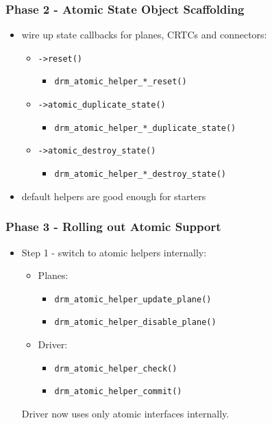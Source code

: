 \documentclass[t]{beamer}
\begin{document}
\begin{frame}
	\frametitle{Phase 2 - Atomic State Object Scaffolding}
	\begin{itemize}
		\item wire up state callbacks for planes, CRTCs and connectors:
			\begin{itemize}
				\item {\tt ->reset()}
					\begin{itemize}
						\item {\tt drm\_atomic\_helper\_*\_reset()}
					\end{itemize}
				\item {\tt ->atomic\_duplicate\_state()}
					\begin{itemize}
						\item {\tt drm\_atomic\_helper\_*\_duplicate\_state()}
					\end{itemize}
				\item {\tt ->atomic\_destroy\_state()}
					\begin{itemize}
						\item {\tt drm\_atomic\_helper\_*\_destroy\_state()}
					\end{itemize}
			\end{itemize}
		\item default helpers are good enough for starters
	\end{itemize}
\end{frame}

\begin{frame}
	\frametitle{Phase 3 - Rolling out Atomic Support}
	\begin{itemize}
		\item Step 1 - switch to atomic helpers internally:
			\begin{itemize}
				\item Planes:
					\begin{itemize}
						\item {\tt drm\_atomic\_helper\_update\_plane()}
						\item {\tt drm\_atomic\_helper\_disable\_plane()}
					\end{itemize}
				\item Driver:
					\begin{itemize}
						\item {\tt drm\_atomic\_helper\_check()}
						\item {\tt drm\_atomic\_helper\_commit()}
					\end{itemize}
			\end{itemize}
			Driver now uses only atomic interfaces internally.
	\end{itemize}
\end{frame}
\end{document}
